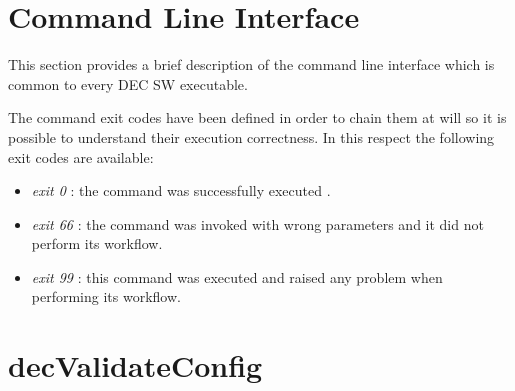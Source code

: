 \documentclass[dec_sum_main.tex]{subfiles}
\begin{document}
\label{CLI}
\section{Command Line Interface}
This section provides a brief description of the command line interface which is common to every DEC SW executable.\newline

\par \noindent
The command exit codes have been defined in order to chain them at will so it is possible to understand their execution correctness. In this respect the following exit codes are available:

\begin{itemize}
	\item \textit{exit 0} : the command was successfully executed .
	\item \textit{exit 66} : the command was invoked with wrong parameters and it did not perform its workflow.
	\item \textit{exit 99} : this command was executed and raised any problem when performing its workflow.
\end{itemize}

\label{decValidateConfig}
\section{decValidateConfig}
\end{document}

